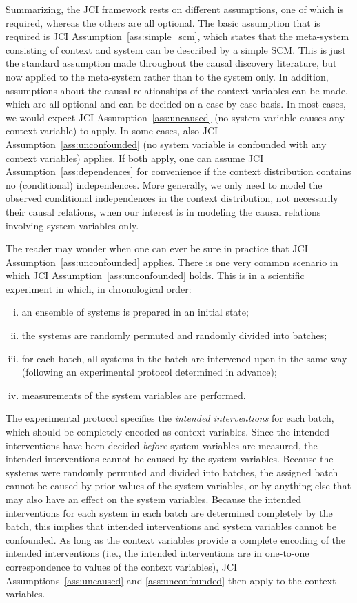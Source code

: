 \documentclass[twoside,11pt]{article}
\begin{document}
Summarizing, the JCI framework rests on different assumptions, one of which is required, whereas the others are all optional.
The basic assumption that is required is JCI Assumption~\ref{ass:simple_scm}, which states that the meta-system consisting of context and system can be described by a simple SCM.
This is just the standard assumption made throughout the causal discovery literature, but now applied to the meta-system rather than to the system only.
In addition, assumptions about the causal relationships of the context variables can be made, which are all optional and can be decided on a case-by-case basis.
In most cases, we would expect JCI Assumption~\ref{ass:uncaused} (no system variable causes any context
variable) to apply. 
In some cases, also JCI Assumption~\ref{ass:unconfounded} (no system variable is confounded with any context variables) applies.
If both apply, one can assume JCI Assumption~\ref{ass:dependences} for convenience if the context distribution contains no (conditional) independences.
More generally, we only need to model the observed conditional independences in the context distribution,
not necessarily their causal relations, when our interest is in modeling the causal relations involving 
system variables only.

The reader may wonder when one can ever be sure in practice that JCI Assumption~\ref{ass:unconfounded} applies.
There is one very common scenario in which JCI Assumption~\ref{ass:unconfounded} holds. This is in a scientific
experiment in which, in chronological order:
\begin{enumerate}[(i)]
  \item an ensemble of systems is prepared in an initial state;
  \item the systems are randomly permuted and randomly divided into batches;
  \item for each batch, all systems in the batch are intervened upon in the same way
    (following an experimental protocol determined in advance);
  \item measurements of the system variables are performed.
\end{enumerate}
The experimental protocol specifies the \emph{intended interventions} for each batch, 
which should be completely encoded as context variables.
Since the intended interventions have been decided \emph{before}
system variables are measured, the intended interventions cannot be caused by
the system variables.
Because the systems were randomly
permuted and divided into batches, the assigned batch cannot be caused by 
prior values of the system variables, or by anything else that may also have an effect on the system variables.
Because the intended interventions for each system in each batch are 
determined completely by the batch, this implies that intended interventions and system variables cannot be confounded.
As long as the context variables
provide a complete encoding of the intended interventions (i.e., the intended interventions
are in one-to-one correspondence to values of the context variables), JCI Assumptions~\ref{ass:uncaused}
and \ref{ass:unconfounded} then apply to the context variables.
\end{document}
